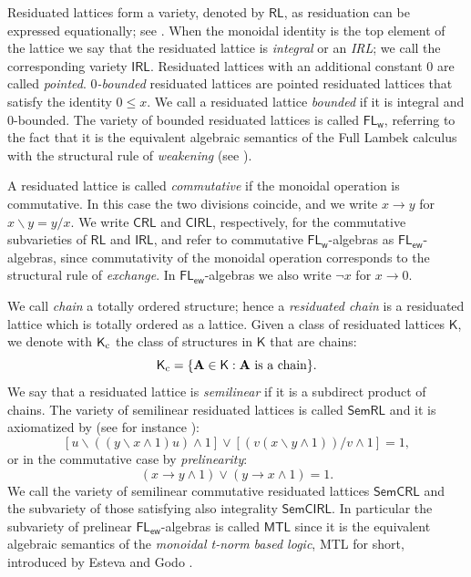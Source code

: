 \documentclass{amsart}
\theoremstyle{definition}
\numberwithin{equation}{section}
\newcommand{\join}{\vee}
\newcommand{\meet}{\wedge}
\newcommand{\alg}[1]{{\textbf{\upshape #1}}}  %
\newcommand{\vv}[1]{\mathsf {#1}}
\newcommand{\back}{\backslash}
\begin{document}
Residuated lattices form a variety, denoted by $\mathsf{RL}$, as residuation can be expressed equationally; see \cite{BlountTsinakis2003}. When the monoidal identity is the top element of the lattice we say that the residuated lattice is \emph{integral} or an \emph{IRL}; we call the corresponding variety $\mathsf{IRL}$.
Residuated lattices with an additional constant $0$ are called \emph{pointed}. \emph{$0$-bounded} residuated lattices are pointed residuated lattices that satisfy the identity $0 \leq x$. We call a residuated lattice {\em bounded} if it is integral and $0$-bounded.
 The variety of bounded residuated lattices is called $\mathsf{FL_w}$, referring to the fact that it is the equivalent algebraic semantics of the Full Lambek calculus with the structural rule of {\em weakening} (see \cite{GJKO,MPT2023}). 

A residuated lattice is called \emph{commutative} if the monoidal operation is commutative. In this case the two divisions coincide, and we write $x \to y$ for $x \back y = y / x$. We write $\mathsf{CRL}$ and $\mathsf{CIRL}$, respectively, for the commutative subvarieties of $\mathsf{RL}$ and $\mathsf{IRL}$, and refer to commutative $\mathsf{FL_{w}}$-algebras as $\mathsf{FL_{ew}}$-algebras, since commutativity of the monoidal operation corresponds to the structural rule of {\em exchange}. In $\vv{FL_{ew}}$-algebras we also write $\neg x$ for $x \to 0$. 

We call \emph{chain} a totally ordered structure; hence a \emph{residuated chain} is a residuated lattice which is totally ordered as a lattice. 
Given a class of residuated lattices $\vv K$, we denote with $\vv K_{\rm c}$ the class of structures in $\vv K$ that are chains:
\begin{equation}
	\vv K_{\rm c} = \{\alg A \in \vv K: \alg A \mbox{ is a chain}\}.
\end{equation}
We say that a residuated lattice is \emph{semilinear} if it is a subdirect product of chains. The variety of semilinear residuated lattices is called $\vv{SemRL}$ and it is axiomatized by (see for instance \cite{MPT2023}): 
\begin{equation}
	\tag{sem} [u\backslash((y \backslash x \land 1)u) \meet 1] \lor  [(v(x \backslash y \land 1))/ v \meet 1]=1,
\end{equation}
 or in the commutative case by \emph{prelinearity}:
\begin{equation}
	\tag{prel} (x \to y \land 1) \join (y \to x \land 1) = 1.
\end{equation} 
We call the variety of semilinear commutative residuated lattices $\vv{SemCRL}$ and the subvariety of those satisfying also integrality $\vv{SemCIRL}$.
In particular the subvariety of prelinear $\vv {FL_{ew}}$-algebras is called $\vv{MTL}$ since it is the equivalent algebraic semantics of the \emph{monoidal t-norm based logic}, MTL for short,  introduced by Esteva and Godo \cite{EstevaGodo2001}. 
\end{document}

